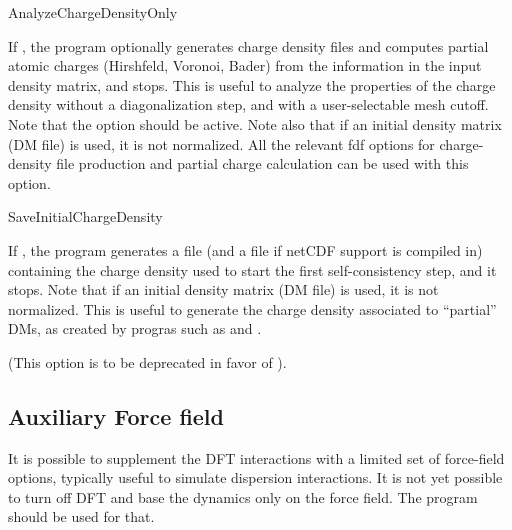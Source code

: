 \begin{fdflogicalF}{AnalyzeChargeDensityOnly}

  If \fdftrue, the program optionally generates charge density files
  and computes partial atomic charges (Hirshfeld, Voronoi, Bader) from
  the information in the input density matrix, and stops.  This is
  useful to analyze the properties of the charge density without a
  diagonalization step, and with a user-selectable mesh cutoff.  Note
  that the  option should be active.  Note also that
  if an initial density matrix (DM file) is used, it is not
  normalized. All the relevant fdf options for charge-density file
  production and partial charge calculation can be used with this option.

\end{fdflogicalF}

\begin{fdflogicalF}{SaveInitialChargeDensity}

  If \fdftrue, the program generates a 
  file (and a  file if netCDF support is
  compiled in) containing the charge density used to start the first
  self-consistency step, and it stops. Note that if an initial density
  matrix (DM file) is used, it is not normalized. This is useful to
  generate the charge density associated to ``partial'' DMs, as
  created by progras such as  and
  .

  (This option is to be deprecated in favor of ).
\end{fdflogicalF}
  

\subsection{Auxiliary Force field}

It is possible to supplement the DFT interactions with a limited
set of force-field options, typically useful to simulate dispersion
interactions. It is not yet possible to turn off DFT and base the
dynamics only on the force field. The  program should be
used for that.

